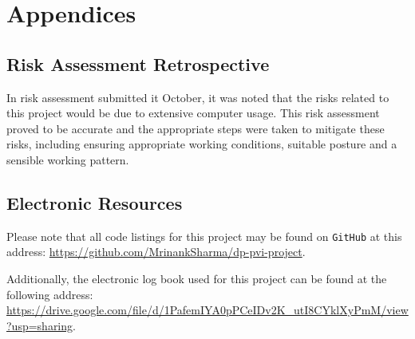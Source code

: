  \chapter{Appendices}
\section{Risk Assessment Retrospective}
In risk assessment submitted it October, it was noted that the risks related to this project would be due to extensive computer usage. This risk assessment proved to be accurate and the appropriate steps were taken to mitigate these risks, including ensuring appropriate working conditions, suitable posture and a sensible working pattern. 

\section{Electronic Resources}
Please note that all code listings for this project may be found on \texttt{GitHub} at this address: \url{https://github.com/MrinankSharma/dp-pvi-project}. 

Additionally, the electronic log book used for this project can be found at the following address: \url{https://drive.google.com/file/d/1PafemIYA0pPCeIDv2K_utI8CYklXyPmM/view?usp=sharing}.